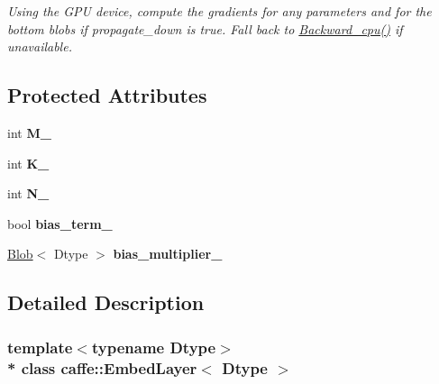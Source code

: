 \begin{DoxyCompactItemize}
\begin{DoxyCompactList}\small\item\em Using the G\+PU device, compute the gradients for any parameters and for the bottom blobs if propagate\+\_\+down is true. Fall back to \hyperlink{classcaffe_1_1EmbedLayer_a863ed3e35d22a1b7b64c05b3dcafc218}{Backward\+\_\+cpu()} if unavailable. \end{DoxyCompactList}\end{DoxyCompactItemize}
\subsection*{Protected Attributes}
\begin{DoxyCompactItemize}
\item 
int {\bfseries M\+\_\+}\hypertarget{classcaffe_1_1EmbedLayer_ab141ec84d4a4617c69534594f32de458}{}\label{classcaffe_1_1EmbedLayer_ab141ec84d4a4617c69534594f32de458}

\item 
int {\bfseries K\+\_\+}\hypertarget{classcaffe_1_1EmbedLayer_a4c3ea441f384c996a22bf5f5927119a5}{}\label{classcaffe_1_1EmbedLayer_a4c3ea441f384c996a22bf5f5927119a5}

\item 
int {\bfseries N\+\_\+}\hypertarget{classcaffe_1_1EmbedLayer_a47e98f5f2b174d63e5563391d27e61c7}{}\label{classcaffe_1_1EmbedLayer_a47e98f5f2b174d63e5563391d27e61c7}

\item 
bool {\bfseries bias\+\_\+term\+\_\+}\hypertarget{classcaffe_1_1EmbedLayer_aa961db47dca56c819cf9b6c185227cbd}{}\label{classcaffe_1_1EmbedLayer_aa961db47dca56c819cf9b6c185227cbd}

\item 
\hyperlink{classcaffe_1_1Blob}{Blob}$<$ Dtype $>$ {\bfseries bias\+\_\+multiplier\+\_\+}\hypertarget{classcaffe_1_1EmbedLayer_a8b7542af1502f96d4d811db337bb7727}{}\label{classcaffe_1_1EmbedLayer_a8b7542af1502f96d4d811db337bb7727}

\end{DoxyCompactItemize}


\subsection{Detailed Description}
\subsubsection*{template$<$typename Dtype$>$\\*
class caffe\+::\+Embed\+Layer$<$ Dtype $>$}

